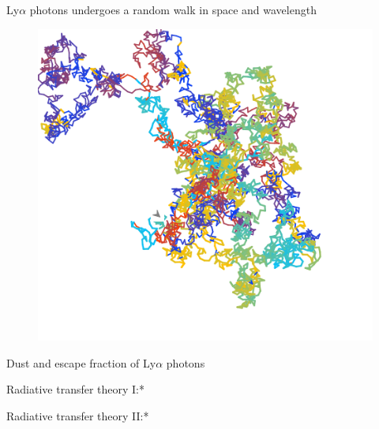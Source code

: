\documentclass{beamer}
\begin{document}
\begin{frame}{Ly$\alpha$ photons undergoes a random walk in space and wavelength}
\begin{figure}
\includegraphics[scale=0.4]{Figures/rand_walk.png}
\end{figure}
\end{frame}

\begin{frame}{Dust and escape fraction of Ly$\alpha$ photons}

\end{frame}

\begin{frame}{Radiative transfer theory I:*}

\end{frame}

\begin{frame}{Radiative transfer theory II:*}

\end{frame}

\end{document}
